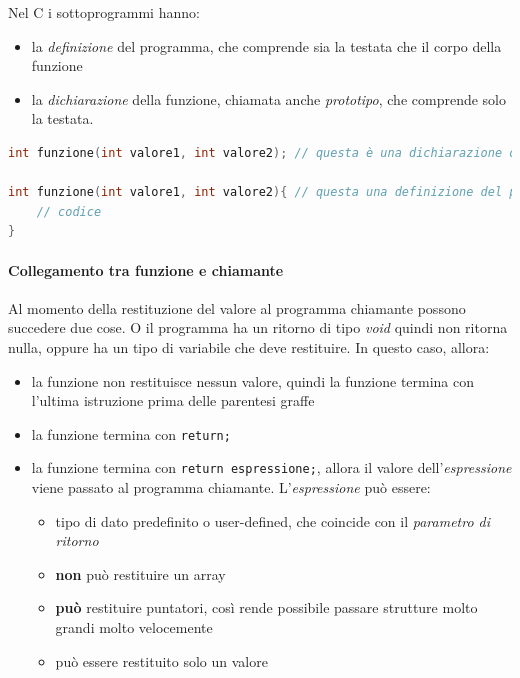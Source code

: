 \documentclass[
  paper=a4,
  oneside  ,captions=tableheading
]{scrbook}
\newcommand{\passthrough}[1]{#1}
\providecommand{\tightlist}{%
  \setlength{\itemsep}{0pt}\setlength{\parskip}{0pt}}
\begin{document}
Nel C i sottoprogrammi hanno:

\begin{itemize}
\tightlist
\item
  la \emph{definizione} del programma, che comprende sia la testata che
  il corpo della funzione
\item
  la \emph{dichiarazione} della funzione, chiamata anche
  \emph{prototipo}, che comprende solo la testata.
\end{itemize}

\begin{lstlisting}[language=C]
int funzione(int valore1, int valore2); // questa è una dichiarazione o prototipo

int funzione(int valore1, int valore2){ // questa una definizione del programma
    // codice
}
\end{lstlisting}

\hypertarget{collegamento-tra-funzione-e-chiamante}{%
\paragraph{Collegamento tra funzione e
chiamante}\label{collegamento-tra-funzione-e-chiamante}}

Al momento della restituzione del valore al programma chiamante possono
succedere due cose. O il programma ha un ritorno di tipo \emph{void}
quindi non ritorna nulla, oppure ha un tipo di variabile che deve
restituire. In questo caso, allora:

\begin{itemize}
\item
  la funzione non restituisce nessun valore, quindi la funzione termina
  con l'ultima istruzione prima delle parentesi graffe
\item
  la funzione termina con \passthrough{\lstinline!return;!}
\item
  la funzione termina con \passthrough{\lstinline!return espressione;!},
  allora il valore dell'\emph{espressione} viene passato al programma
  chiamante. L'\emph{espressione} può essere:

  \begin{itemize}
  \tightlist
  \item
    tipo di dato predefinito o user-defined, che coincide con il
    \emph{parametro di ritorno}
  \item
    \textbf{non} può restituire un array
  \item
    \textbf{può} restituire puntatori, così rende possibile passare
    strutture molto grandi molto velocemente
  \item
    può essere restituito solo un valore
  \end{itemize}
\end{itemize}
\end{document}
